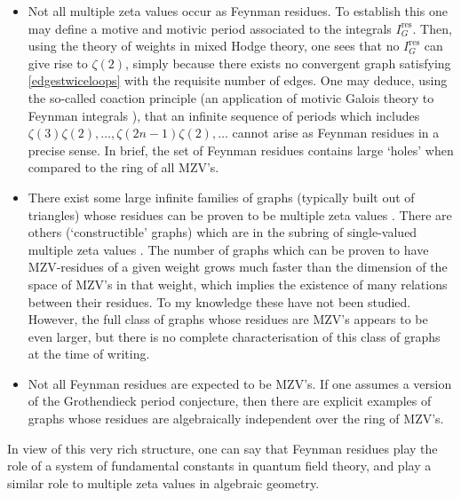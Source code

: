 \documentclass[12pt]{amsart}
\newcommand{\res}{\mathrm{res}}
\theoremstyle{plain}
\newcommand{\0}{\color{blue}{\mathsf{0}}}
\begin{document}
\begin{itemize}
 
\item Not all multiple zeta values  occur as Feynman residues. To establish this one may define a motive \cite{BEK} and motivic period \cite{brownnotesmot} associated to the integrals $I^{\res}_G$. Then, using the theory of weights in mixed Hodge theory, one sees  that no $I^{\res}_G$ 
can give rise to $\zeta(2)$, simply because there exists no convergent graph  satisfying \eqref{edgestwiceloops} with the requisite number of edges. One may deduce, using the so-called coaction principle (an application of motivic Galois theory to Feynman integrals \cite{Cosmic}),  that an infinite sequence of periods which includes $\zeta(3)\zeta(2), \ldots, \zeta(2n-1)\zeta(2), \ldots $ cannot arise as Feynman residues in a precise sense.  In brief, the set of Feynman residues contains large `holes' when compared to the ring of all  MZV's. 





\item  There exist some large infinite families of graphs (typically built out of triangles) whose residues  can be proven to be multiple zeta values \cite{PeriodsFeynman}. There are  others (`constructible' graphs) which are in the subring of single-valued multiple zeta values \cite{schnetz2014graphical}.  The number of graphs which can be proven to have  MZV-residues of a given weight  grows  much faster  than the dimension of the space of MZV's in that weight, which implies the existence of many relations between their residues.  To my knowledge these have not been studied. However,  the full class of graphs whose residues are MZV's appears to be even larger, but there is no complete characterisation of this class of graphs at the time of writing. 

\item Not all Feynman residues are expected to be MZV's.  If one assumes a version of the Grothendieck period conjecture, then there are explicit examples of  graphs \cite{BrownSchnetz} whose residues are algebraically independent over the ring of MZV's.
\end{itemize}


 In view of this very rich structure, one can say  that Feynman residues  play the role of a system of fundamental constants in quantum field theory, and play  a similar role to  multiple zeta values  in algebraic geometry. 
\end{document}
